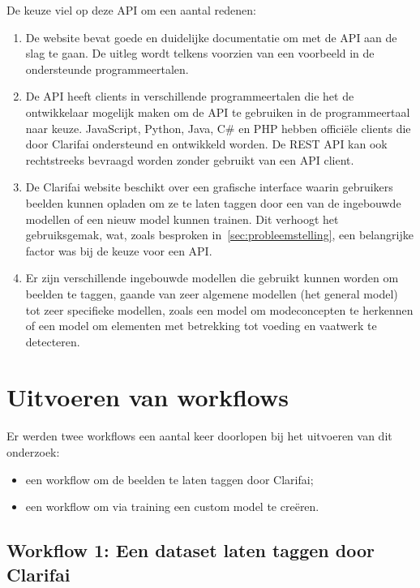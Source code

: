 De keuze viel op deze API om een aantal redenen:
\begin{enumerate}
	\item De website bevat goede en duidelijke documentatie om met de API aan de slag te gaan. De uitleg wordt telkens voorzien van een voorbeeld in de ondersteunde programmeertalen. %
	\item De API heeft clients in verschillende programmeertalen die het de ontwikkelaar mogelijk maken om de API te gebruiken in de programmeertaal naar keuze. JavaScript, Python, Java, C\# en PHP hebben officiële clients die door Clarifai ondersteund en ontwikkeld worden. De REST API kan ook rechtstreeks bevraagd worden zonder gebruikt van een API client.
	\item De Clarifai website beschikt over een grafische interface waarin gebruikers beelden kunnen opladen om ze te laten taggen door een van de ingebouwde modellen of een nieuw model kunnen trainen. Dit verhoogt het gebruiksgemak, wat, zoals besproken in~\ref{sec:probleemstelling}, een belangrijke factor was bij de keuze voor een API.
	\item Er zijn verschillende ingebouwde modellen die gebruikt kunnen worden om beelden te taggen, gaande van zeer algemene modellen (het general model) tot zeer specifieke modellen, zoals een model om modeconcepten te herkennen of een model om elementen met betrekking tot voeding en vaatwerk te detecteren.
\end{enumerate}

\section{Uitvoeren van workflows}
\label{sec:uitvoeren-workflows}

Er werden twee workflows een aantal keer doorlopen bij het uitvoeren van dit onderzoek:
\begin{itemize}
	\item een workflow om de beelden te laten taggen door Clarifai;
	\item een workflow om via training een custom model te cre\"{e}ren.
\end{itemize}

\subsection{Workflow 1: Een dataset laten taggen door Clarifai}
\label{subsec:workflow1}


